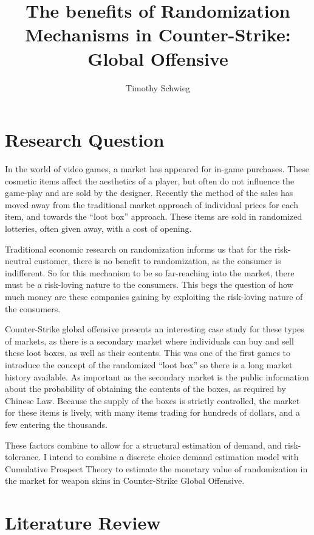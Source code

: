\documentclass[12pt]{paper}
\title{The benefits of Randomization Mechanisms in Counter-Strike:
  Global Offensive}
\author{Timothy Schwieg}
\begin{document}
\maketitle

\section{Research Question}


In the world of video games, a market has appeared for in-game
purchases. These cosmetic items affect the aesthetics of a player, but
often do not influence the game-play and are sold by the
designer. Recently the method of the sales has moved away from the
traditional market approach of individual prices for each item, and
towards the ``loot box'' approach. These items are sold in randomized
lotteries, often given away, with a cost of opening.

Traditional economic research on randomization informs us that for the
risk-neutral customer, there is no benefit to randomization, as the
consumer is indifferent. So for this mechanism to be so far-reaching
into the market, there must be a risk-loving nature to the
consumers. This begs the question of how much money are these
companies gaining by exploiting the risk-loving nature of the
consumers.

Counter-Strike global offensive presents an interesting case study for
these types of markets, as there is a secondary market where
individuals can buy and sell these loot boxes, as well as their
contents. This was one of the first games to introduce the concept of
the randomized ``loot box'' so there is a long market history
available. As important as the secondary market is the public
information about the probability of obtaining the contents of the
boxes, as required by Chinese Law. Because the supply of the boxes is
strictly controlled, the market for these items is lively, with many
items trading for hundreds of dollars, and a few entering the thousands.


These factors combine to allow for a structural estimation of demand,
and risk-tolerance. I intend to combine a discrete choice demand
estimation model with Cumulative Prospect Theory to estimate the
monetary value of randomization in the market for weapon skins in
Counter-Strike Global Offensive.

\section{Literature Review}
\end{document}
